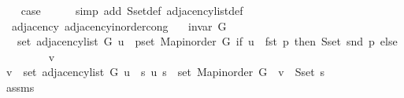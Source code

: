 \begin{isabellebody}
\ \ \isamarkupfalse%
\ {\isacharquery}{\kern0pt}case\isanewline
\ \ \ \ \isamarkupfalse%
\ {\isacharparenleft}{\kern0pt}simp\ add{\isacharcolon}{\kern0pt}\ S{\isachardot}{\kern0pt}set{\isacharunderscore}{\kern0pt}def\ adjacency{\isacharunderscore}{\kern0pt}list{\isacharunderscore}{\kern0pt}def{\isacharparenright}{\kern0pt}\isanewline
{}\isamarkupfalse%
%
\endisatagproof
{\isafoldproof}%
%
\isadelimproof
\isanewline
%
\endisadelimproof
%
\isadeliminvisible
\isanewline
%
\endisadeliminvisible
%
\isataginvisible
{}\isamarkupfalse%
\ {\isacharparenleft}{\kern0pt}\ adjacency{\isacharparenright}{\kern0pt}\ adjacency{\isacharunderscore}{\kern0pt}inorder{\isacharunderscore}{\kern0pt}cong{\isacharcolon}{\kern0pt}\isanewline
\ \ \ {\isachardoublequoteopen}invar\ G{\isachardoublequoteclose}\isanewline
\ \ \ {\isachardoublequoteopen}set\ {\isacharparenleft}{\kern0pt}adjacency{\isacharunderscore}{\kern0pt}list\ G\ u{\isacharparenright}{\kern0pt}\ {\isacharequal}{\kern0pt}\ {\isacharparenleft}{\kern0pt}{\isasymUnion}p{\isasymin}set\ {\isacharparenleft}{\kern0pt}Map{\isacharunderscore}{\kern0pt}inorder\ G{\isacharparenright}{\kern0pt}{\isachardot}{\kern0pt}\ if\ u\ {\isacharequal}{\kern0pt}\ fst\ p\ then\ S{\isachardot}{\kern0pt}set\ {\isacharparenleft}{\kern0pt}snd\ p{\isacharparenright}{\kern0pt}\ else\ {\isacharbraceleft}{\kern0pt}{\isacharbraceright}{\kern0pt}{\isacharparenright}{\kern0pt}{\isachardoublequoteclose}%
\endisataginvisible
{\isafoldinvisible}%
%
\isadeliminvisible
\isanewline
%
\endisadeliminvisible
%
\isadelimproof
%
\endisadelimproof
%
\isatagproof
{}\isamarkupfalse%
\ {\isacharminus}{\kern0pt}\isanewline
\ \ \isacommand{{\isacharbraceleft}{\kern0pt}}\isamarkupfalse%
\ \isamarkupfalse%
\ v\isanewline
\ \ \ \ \isamarkupfalse%
\ {\isachardoublequoteopen}v\ {\isasymin}\ set\ {\isacharparenleft}{\kern0pt}adjacency{\isacharunderscore}{\kern0pt}list\ G\ u{\isacharparenright}{\kern0pt}\ {\isasymlongleftrightarrow}\ {\isacharparenleft}{\kern0pt}{\isasymexists}s{\isachardot}{\kern0pt}\ {\isacharparenleft}{\kern0pt}u{\isacharcomma}{\kern0pt}\ s{\isacharparenright}{\kern0pt}\ {\isasymin}\ set\ {\isacharparenleft}{\kern0pt}Map{\isacharunderscore}{\kern0pt}inorder\ G{\isacharparenright}{\kern0pt}\ {\isasymand}\ v\ {\isasymin}\ S{\isachardot}{\kern0pt}set\ s{\isacharparenright}{\kern0pt}{\isachardoublequoteclose}\isanewline
\ \ \ \ \ \ \isamarkupfalse%
\ assms\isanewline
\ \ \ \ \ \ \isamarkupfalse%

\end{isabellebody}
